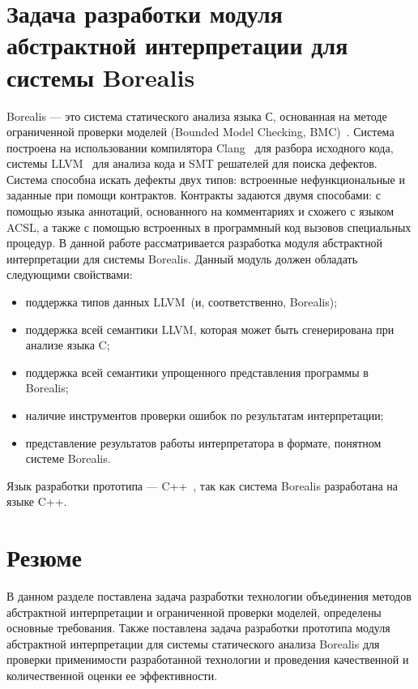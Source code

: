 \section{Задача разработки модуля абстрактной интерпретации для системы 
Borealis}
Borealis --- это система статического анализа языка С, основанная на методе 
ограниченной проверки моделей (Bounded Model Checking, BMC)~\cite{bmc}. Система 
построена на использовании компилятора Clang~\cite{clang} для разбора исходного 
кода, системы LLVM~\cite{llvm} для анализа кода и SMT решателей для поиска 
дефектов. Система способна искать дефекты двух типов: встроенные 
нефункциональные и заданные при помощи контрактов. Контракты задаются двумя 
способами: с помощью языка аннотаций, основанного на комментариях и схожего с 
языком ACSL, а также с помощью встроенных в программный код вызовов специальных 
процедур. В данной работе рассматривается разработка модуля абстрактной 
интерпретации для системы Borealis. Данный модуль должен обладать следующими
свойствами:
\begin{itemize}
\item поддержка типов данных LLVM~(и, соответственно, Borealis);
\item поддержка всей семантики LLVM, которая может быть сгенерирована при 
анализе языка C;
\item поддержка всей семантики упрощенного представления программы в Borealis;
\item наличие инструментов проверки ошибок по результатам интерпретации;
\item представление результатов работы интерпретатора в формате, понятном 
системе Borealis.
\end{itemize}

Язык разработки прототипа --- C++~\cite{languageC++}, так как система Borealis 
разработана на языке C++.

\section{Резюме}
В данном разделе поставлена задача разработки технологии объединения методов
абстрактной интерпретации и ограниченной проверки моделей, определены основные 
требования. Также поставлена задача разработки прототипа модуля абстрактной
интерпретации для системы статического анализа Borealis для проверки 
применимости разработанной технологии и проведения качественной и 
количественной оценки ее эффективности.